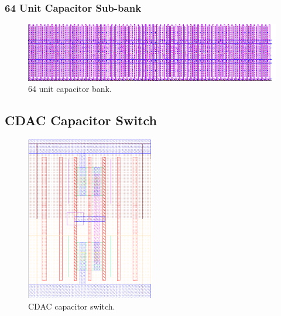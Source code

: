 			\subsubsection{64 Unit Capacitor Sub-bank}
				\begin{figure}[htb!]
				        \centering
				        \includegraphics[width=\textwidth, angle=0]{./figs/layout/layout_cdac_unit_capbank}
				    \caption{64 unit capacitor bank.}
				\end{figure}
			\FloatBarrier
			\subsection{CDAC Capacitor Switch}
				\begin{figure}[htb!]
				        \centering
				        \includegraphics[width=0.5\textwidth, angle=0]{./figs/layout/layout_cdac_sw}
				    \caption{CDAC capacitor switch.}
				\end{figure}
		\FloatBarrier\pagebreak
